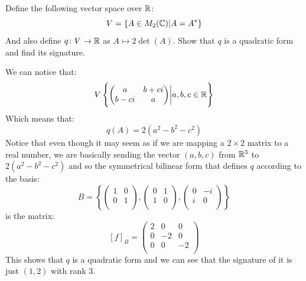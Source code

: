 \documentclass[11pt, a4paper]{article}
\begin{document}
\begin{exercise}
  Define the following vector space over $\mathbb{R}$:
  \[
    V = \{A \in M_2(\mathbb{C}) \vert A = A^*\}
  \]
  And also define $q \colon V \to \mathbb{R}$ as 
  $
    A \mapsto 2 \det(A)
  $.
  Show that $q$ is a quadratic form and find its signature.
\end{exercise}
\begin{solution}
  We can notice that:
  \[
    V \left\{
    \begin{pmatrix}
      a & b + ci\\
      b - ci & a\\
    \end{pmatrix}
     \biggr\vert a,b,c\in\mathbb{R}
     \right\}
  \]
  Which means that:
  \[
    q(A) = 2(a^2 - b^2 - c^2)
  \]
  Notice that even though it may seem as if we are mapping a $2 \times 2$
  matrix to a real number, we are basically sending the vector $(a,b,c)$
  from $\mathbb{R}^3$ to $2(a^2 - b^2 - c^2)$ and so the symmetrical bilinear
  form that defines $q$ according to the basis:
  \[
    B = 
    \left\{
      \begin{pmatrix}
        1 & 0\\
        0 & 1\\
      \end{pmatrix},
      \begin{pmatrix}
        0 & 1\\
        1 & 0\\
      \end{pmatrix},
      \begin{pmatrix}
        0 & -i\\
        i & 0\\
      \end{pmatrix}
    \right\}
  \]
  is the matrix:
  \[
  [f]_B = \begin{pmatrix}
    2 & 0 & 0\\
    0 & -2 & 0\\
    0 & 0 & -2\\
  \end{pmatrix}
  \]
  This shows that $q$ is a quadratic form and we can see that the signature
  of it is just $(1,2)$ with rank $3$.
\end{solution}
\end{document}
